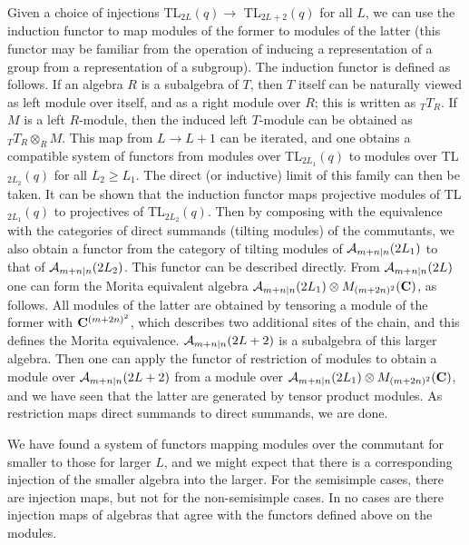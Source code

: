 \documentclass[twocolumn,floats,pra]{revtex4}
\def \cA {{\cal A}}
\begin{document}
Given a choice of injections TL$_{2L}(q)\rightarrow$
TL$_{2L+2}(q)$ for all $L$, we can use the induction functor to
map modules of the former to modules of the latter (this functor
may be familiar from the operation of inducing a representation of
a group from a representation of a subgroup). The induction
functor is defined as follows. If an algebra $R$ is a subalgebra
of $T$, then $T$ itself can be naturally viewed as left module
over itself, and as a right module over $R$; this is written as
$_{T}T_{R}$. If $M$ is a left $R$-module, then the induced left
$T$-module can be obtained as $_{T}T_{R}\otimes_R M$.  This map
from $L\to L+1$ can be iterated, and one obtains a compatible
system of functors from modules over TL$_{2L_1}(q)$ to modules
over TL$_{2L_2}(q)$ for all $L_2\geq L_1$. The direct (or
inductive) limit of this family can then be taken. It can be shown
that the induction functor maps projective modules of
TL$_{2L_1}(q)$ to projectives of TL$_{2L_2}(q)$. Then by composing
with the equivalence with the categories of direct summands
(tilting modules) of the commutants, we also obtain a functor from
the category of tilting modules of $\cA_{m+n|n}(2L_1)$ to that of
$\cA_{m+n|n}(2L_2)$. This functor can be described directly.
{}From $\cA_{m+n|n}(2L)$ one can form the Morita equivalent
algebra $\cA_{m+n|n}(2L_1)\otimes M_{(m+2n)^2}({\bf C})$, as
follows. All modules of the latter are obtained by tensoring a
module of the former with ${\bf C}^{(m+2n)^2}$, which describes
two additional sites of the chain, and this defines the Morita
equivalence. $\cA_{m+n|n}(2L+2)$ is a subalgebra of this larger
algebra. Then one can apply the functor of restriction of modules
to obtain a module over $\cA_{m+n|n}(2L+2)$ from a module over
$\cA_{m+n|n}(2L_1)\otimes M_{(m+2n)^2}({\bf C})$, and we have seen
that the latter are generated by tensor product modules. As
restriction maps direct summands to direct summands, we are done.

We have found a system of functors mapping modules over the
commutant for smaller to those for larger $L$, and we might expect
that there is a corresponding injection of the smaller algebra
into the larger. For the semisimple cases, there are injection
maps, but not for the non-semisimple cases. In no cases are there
injection maps of algebras that agree with the functors defined
above on the modules.
\end{document}
